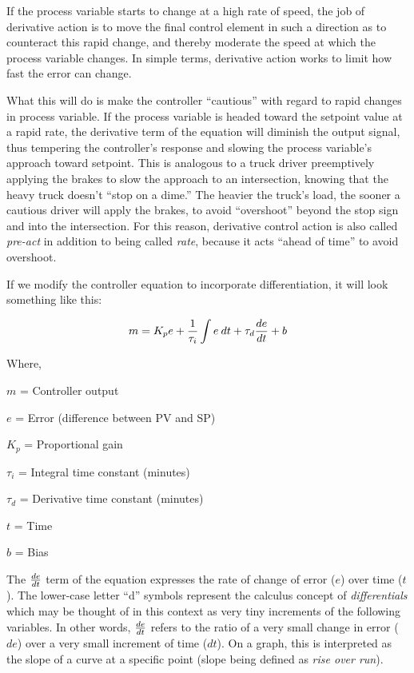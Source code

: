 If the process variable starts to change at a high rate of speed, the job of derivative action is to move the final control element in such a direction as to counteract this rapid change, and thereby moderate the speed at which the process variable changes.  In simple terms, derivative action works to limit how fast the error can change.

What this will do is make the controller ``cautious'' with regard to rapid changes in process variable.  If the process variable is headed toward the setpoint value at a rapid rate, the derivative term of the equation will diminish the output signal, thus tempering the controller's response and slowing the process variable's approach toward setpoint.  This is analogous to a truck driver preemptively applying the brakes to slow the approach to an intersection, knowing that the heavy truck doesn't ``stop on a dime.''  The heavier the truck's load, the sooner a cautious driver will apply the brakes, to avoid ``overshoot'' beyond the stop sign and into the intersection.  For this reason, derivative control action is also called \textit{pre-act} in addition to being called \textit{rate}, because it acts ``ahead of time'' to avoid overshoot.    
 
If we modify the controller equation to incorporate differentiation, it will look something like this:
 
$$m = K_p e + {1 \over \tau_i} \int e \> dt + \tau_d {de \over dt} + b$$

\noindent
Where,

$m$ = Controller output

$e$ = Error (difference between PV and SP)

$K_p$ = Proportional gain

$\tau_i$ = Integral time constant (minutes)

$\tau_d$ = Derivative time constant (minutes)

$t$ = Time

$b$ = Bias

\vskip 10pt

The $de \over dt$ term of the equation expresses the rate of change of error ($e$) over time ($t$).  The lower-case letter ``d'' symbols represent the calculus concept of \textit{differentials} which may be thought of in this context as very tiny increments of the following variables.  In other words, $de \over dt$ refers to the ratio of a very small change in error ($de$) over a very small increment of time ($dt$).  On a graph, this is interpreted as the slope of a curve at a specific point (slope being defined as \textit{rise over run}). 

